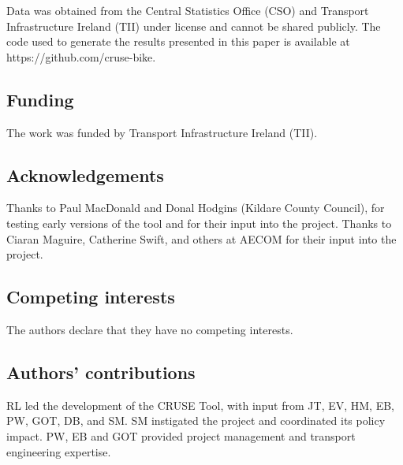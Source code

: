 \documentclass[
  super,
  preprint,
  3p]{elsarticle}
\begin{document}
Data was obtained from the Central Statistics Office (CSO) and Transport
Infrastructure Ireland (TII) under license and cannot be shared
publicly. The code used to generate the results presented in this paper
is available at https://github.com/cruse-bike.

\hypertarget{funding}{%
\subsection*{Funding}\label{funding}}

The work was funded by Transport Infrastructure Ireland (TII).

\hypertarget{acknowledgements}{%
\subsection*{Acknowledgements}\label{acknowledgements}}

Thanks to Paul MacDonald and Donal Hodgins (Kildare County Council), for
testing early versions of the tool and for their input into the project.
Thanks to Ciaran Maguire, Catherine Swift, and others at AECOM for their
input into the project.

\hypertarget{competing-interests}{%
\subsection*{Competing interests}\label{competing-interests}}

The authors declare that they have no competing interests.

\hypertarget{authors-contributions}{%
\subsection*{Authors' contributions}\label{authors-contributions}}

RL led the development of the CRUSE Tool, with input from JT, EV, HM,
EB, PW, GOT, DB, and SM. SM instigated the project and coordinated its
policy impact. PW, EB and GOT provided project management and transport
engineering expertise.


  
\end{document}
